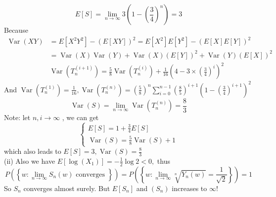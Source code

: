 \documentclass{homework}
\begin{document}
$$
E[S]=\lim _{n \rightarrow \infty} 3\left(1-\left(\frac{3}{4}\right)^{n}\right)=3
$$
Because
$$
\begin{aligned}
\operatorname{Var}(X Y) &=E\left[X^{2} Y^{2}\right]-(E[X Y])^{2}=E\left[X^{2}\right] E\left[Y^{2}\right]-(E[X] E[Y])^{2} \\
&=\operatorname{Var}(X) \operatorname{Var}(Y)+\operatorname{Var}(X)(E[Y])^{2}+\operatorname{Var}(Y)(E[X])^{2} \\
& \operatorname{Var}\left(T_{n}^{(i+1)}\right)=\frac{5}{8} \operatorname{Var}\left(T_{n}^{(i)}\right)+\frac{1}{16}\left(4-3 \times\left(\frac{3}{4}\right)^{i}\right)^{2}
\end{aligned}
$$
And $\operatorname{Var}\left(T_{n}^{(1)}\right)=\frac{1}{16}, \operatorname{Var}\left(T_{n}^{(n)}\right)=\left(\frac{5}{8}\right)^{n} \sum_{i=0}^{n-1}\left(\frac{8}{5}\right)^{i+1}\left(1-\left(\frac{3}{4}\right)^{i+1}\right)^{2}$
$$
\operatorname{Var}(S)=\lim _{n \rightarrow \infty}\operatorname{Var}\left(T_{n}^{(n)}\right)=\frac{8}{3}
$$
Note: let $n, i \rightarrow \infty$ , we can get
$$
\left\{\begin{array}{l}
E[S]=1+\frac{3}{4} E[S] \\
\operatorname{Var}(S)=\frac{5}{8} \operatorname{Var}(S)+1
\end{array}\right.
$$
which also leads to $E[S]=3, \operatorname{Var}(S)=\frac{8}{3}$\\

(ii)
Also we have $E\left[\log \left(X_{1}\right)\right]=-\frac{1}{2} \log 2<0,$ thus
$$
P\left(\left\{w: \lim _{n \rightarrow \infty} S_{n}(w) \text { converges }\right\}\right)=P\left(\left\{w: \lim _{n \rightarrow \infty} \sqrt[n]{Y_{n}(w)}=\frac{1}{\sqrt{2}}\right\}\right)=1
$$
So $S_{n}$ converges almost surely. But $E\left[S_{n}\right]$ and $\left(S_{n}\right)$ increases to $\infty !$
\end{document}
